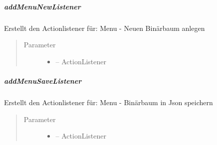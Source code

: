 \documentclass[letterpaper,10pt,ngerman]{sphinxmanual}
\begin{document}
\subparagraph{addMenuNewListener}
\label{\detokenize{com/linuxluigi/edu/view/View:addmenunewlistener}}

\begin{fulllineitems}
\label{\detokenize{com/linuxluigi/edu/view/View:com.linuxluigi.edu.view.View.addMenuNewListener(ActionListener)}}
Erstellt den Actionlistener für: Menu - Neuen Binärbaum anlegen
\begin{quote}\begin{description}
\item[{Parameter}] \leavevmode\begin{itemize}
\item {} 
 -- ActionListener

\end{itemize}

\end{description}\end{quote}

\end{fulllineitems}



\subparagraph{addMenuSaveListener}
\label{\detokenize{com/linuxluigi/edu/view/View:addmenusavelistener}}

\begin{fulllineitems}
\label{\detokenize{com/linuxluigi/edu/view/View:com.linuxluigi.edu.view.View.addMenuSaveListener(ActionListener)}}
Erstellt den Actionlistener für: Menu - Binärbaum in Json speichern
\begin{quote}\begin{description}
\item[{Parameter}] \leavevmode\begin{itemize}
\item {} 
 -- ActionListener

\end{itemize}

\end{description}\end{quote}

\end{fulllineitems}
\end{document}

